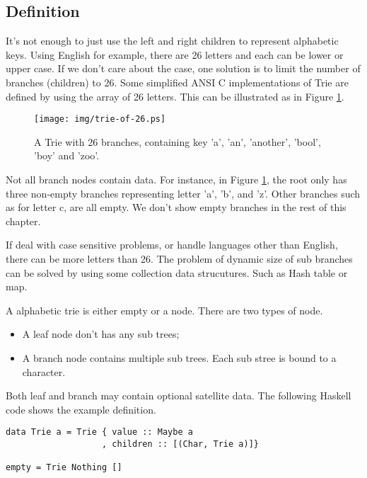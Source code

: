 \documentclass{article}
\begin{document}
\subsection{Definition}
It's not enough to just use the left and right children to represent
alphabetic keys. Using English for example, there are 26 letters
and each can be lower or upper case. If we don't care about the case,
one solution is to limit the number of branches (children) to 26.
Some simplified ANSI C implementations of Trie are defined by using
the array of 26 letters. This can be illustrated as in Figure \ref{fig:trie-of-26}.

\begin{figure}[htbp]
  \centering
  \texttt{[image: img/trie-of-26.ps]}
  \caption{A Trie with 26 branches, containing key 'a', 'an', 'another', 'bool',
    'boy' and 'zoo'.}
  \label{fig:trie-of-26}
\end{figure}

Not all branch nodes contain data. For instance, in Figure \ref{fig:trie-of-26},
the root only has three non-empty branches representing letter 'a',
'b', and 'z'. Other branches such as for letter c, are all
empty. We don't show empty branches in the rest of this chapter.

If deal with case sensitive problems, or handle languages other than English,
there can be more letters than 26. The problem of dynamic size of sub
branches can be solved by using some collection data strucutures. Such
as Hash table or map.

A alphabetic trie is either empty or a node. There are two types of node.

\begin{itemize}
\item A leaf node don't has any sub trees;
\item A branch node contains multiple sub trees. Each sub stree is bound to a character.
\end{itemize}

Both leaf and branch may contain optional satellite data. The following Haskell
code shows the example definition.

\lstset{language=Haskell}
\begin{lstlisting}
data Trie a = Trie { value :: Maybe a
                   , children :: [(Char, Trie a)]}

empty = Trie Nothing []
\end{lstlisting}
\end{document}
